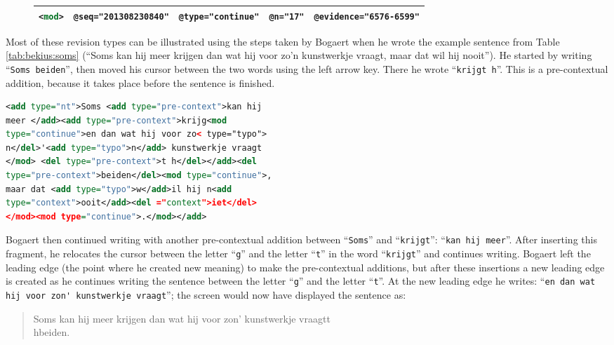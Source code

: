 \begin{paper}
\begin{figure}[H]
\begin{longtable}[]{@{}p{}|p{}|p{}|p{}|p{}@{}}
\hline

\lstinline[language=XML]!<mod>!	&
\lstinline[language=XML]!@seq="201308230840"!	&
\lstinline[language=XML]!@type="continue"! &
\lstinline[language=XML]!@n="17"!	& 
\lstinline[language=XML]!@evidence="6576-6599"! \\

\bottomrule
\end{longtable}
\end{figure}


\noindent Most of these revision types can be illustrated using the steps taken by
Bogaert when he wrote the example sentence from Table \ref{tab:bekius:soms} (``Soms kan hij meer krijgen dan wat hij voor zo’n kunstwerkje vraagt, maar dat wil hij nooit''). He started by writing ``\verb|Soms beiden|'', then moved his
cursor between the two words using the left arrow key. There he wrote
``\verb|krijgt h|''. This is a pre-contextual addition, because it takes place
before the sentence is finished.

\begin{example}
\label{ex:bekius:2}
\begin{lstlisting}[language=XML]
<add type="nt">Soms <add type="pre-context">kan hij 
meer </add><add type="pre-context">krijg<mod 
type="continue">en dan wat hij voor zo< type="typo">
n</del>'<add type="typo">n</add> kunstwerkje vraagt
</mod> <del type="pre-context">t h</del></add><del 
type="pre-context">beiden</del><mod type="continue">,
maar dat <add type="typo">w</add>il hij n<add 
type="context">ooit</add><del ="context">iet</del>
</mod><mod type="continue">.</mod></add>
\end{lstlisting}
\end{example}

\noindent Bogaert then continued writing with another pre-contextual addition
between ``\verb|Soms|'' and ``\verb|krijgt|'': ``\verb|kan hij meer|''. After inserting this
fragment, he relocates the cursor between the letter ``\verb|g|'' and the
letter ``\verb|t|'' in the word ``\verb|krijgt|'' and continues writing. Bogaert left
the leading edge (the point where he created new meaning) to make the
pre-contextual additions, but after these insertions a new leading edge
is created as he continues writing the sentence between the letter ``\verb|g|''
and the letter ``\verb|t|''. At the new leading edge he writes: ``\verb|en dan wat hij voor zon' kunstwerkje vraagt|''; the screen would now have displayed
the sentence as: 

\begin{quote}
Soms kan hij meer krijgen dan wat hij voor zon' kunstwerkje vraagtt \\ hbeiden.
\end{quote} 


\end{paper}
